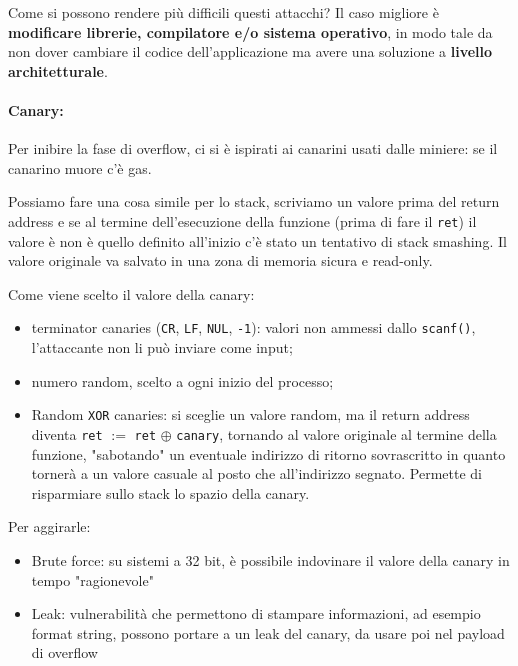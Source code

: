 Come si possono rendere più difficili questi attacchi? Il caso migliore è \textbf{modificare librerie, compilatore e/o sistema operativo}, in modo tale da non dover cambiare il codice dell'applicazione ma avere una soluzione a \textbf{livello architetturale}.

\paragraph{Canary:} Per inibire la fase di overflow, ci si è ispirati ai canarini usati dalle miniere: se il canarino muore c'è gas. 

Possiamo fare una cosa simile per lo stack, scriviamo un valore prima del return address e se al termine dell'esecuzione della funzione (prima di fare il \texttt{ret}) il valore è non è quello definito all'inizio c'è stato un tentativo di stack smashing. Il valore originale va salvato in una zona di memoria sicura e read-only.

Come viene scelto il valore della canary: 
\begin{itemize}
	\item terminator canaries (\texttt{CR}, \texttt{LF}, \texttt{NUL}, \texttt{-1}): valori non ammessi dallo \texttt{scanf()}, l'attaccante non li può inviare come input;
	
    \item numero random, scelto a ogni inizio del processo;
	
    \item Random \texttt{XOR} canaries: si sceglie un valore random, ma il return address diventa \texttt{ret} $:=$ \texttt{ret} $\oplus$ \texttt{canary}, tornando al valore originale al termine della funzione, "sabotando" un eventuale indirizzo di ritorno sovrascritto in quanto tornerà a un valore casuale al posto che all'indirizzo segnato. Permette di risparmiare sullo stack lo spazio della canary.
\end{itemize}

Per aggirarle:
\begin{itemize}
    \item Brute force: su sistemi a 32 bit, è possibile indovinare il valore della canary in tempo "ragionevole"
    
    \item Leak: vulnerabilità che permettono di stampare informazioni, ad esempio format string, possono portare a un leak del canary, da usare poi nel payload di overflow
\end{itemize}

